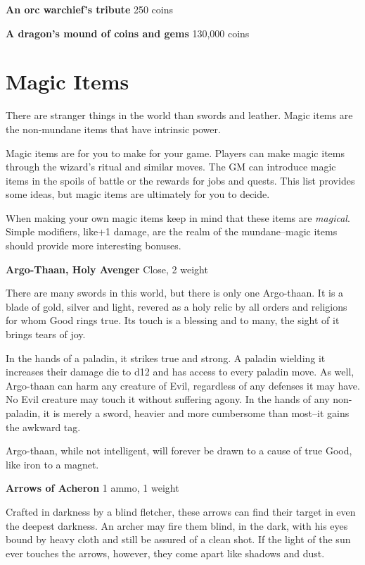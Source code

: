 {\noindent \bfseries An orc warchief's tribute} \hspace*{\fill} 250 coins

{\noindent \bfseries A dragon's mound of coins and gems} \hspace*{\fill} 130,000 coins
\section*{Magic Items}

There are stranger things in the world than swords and leather. Magic items are the non-mundane items that have intrinsic power.

Magic items are for you to make for your game. Players can make magic items through the wizard's ritual and similar moves. The GM can introduce magic items in the spoils of battle or the rewards for jobs and quests. This list provides some ideas, but magic items are ultimately for you to decide.

When making your own magic items keep in mind that these items are \emph{magical}. Simple modifiers, like+1 damage, are the realm of the mundane--magic items should provide more interesting bonuses.

{\noindent \bfseries Argo-Thaan, Holy Avenger} \hspace*{\fill} Close, 2 weight

There are many swords in this world, but there is only one Argo-thaan. It is a blade of gold, silver and light, revered as a holy relic by all orders and religions for whom Good rings true. Its touch is a blessing and to many, the sight of it brings tears of joy.

In the hands of a paladin, it strikes true and strong. A paladin wielding it increases their damage die to d12 and has access to every paladin move. As well, Argo-thaan can harm any creature of Evil, regardless of any defenses it may have. No Evil creature may touch it without suffering agony. In the hands of any non-paladin, it is merely a sword, heavier and more cumbersome than most--it gains the awkward tag.

Argo-thaan, while not intelligent, will forever be drawn to a cause of true Good, like iron to a magnet.

{\noindent \bfseries Arrows of Acheron} \hspace*{\fill} 1 ammo, 1 weight

Crafted in darkness by a blind fletcher, these arrows can find their target in even the deepest darkness. An archer may fire them blind, in the dark, with his eyes bound by heavy cloth and still be assured of a clean shot. If the light of the sun ever touches the arrows, however, they come apart like shadows and dust.

